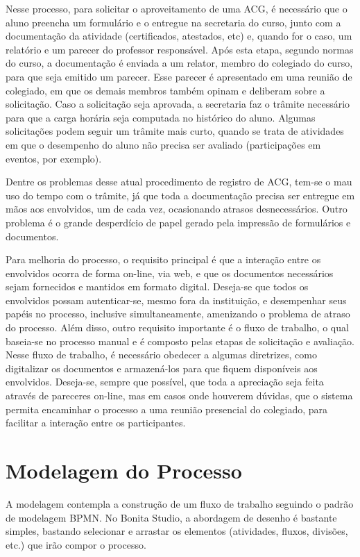 \documentclass[12pt]{article}
\begin{document}
Nesse processo, para solicitar o aproveitamento de uma ACG, é necessário que o aluno preencha um formulário e o entregue na secretaria do curso, junto com a documentação da atividade (certificados, atestados, etc) e, quando for o caso, um relatório e um parecer do professor responsável. Após  esta  etapa,  segundo normas do curso, a documentação é enviada a um relator, membro do colegiado do curso, para que seja emitido um parecer. Esse parecer é apresentado em uma reunião de colegiado, em que os demais membros também opinam e deliberam sobre a solicitação. Caso a solicitação seja  aprovada, a secretaria faz o trâmite necessário para que a carga horária seja computada no histórico do aluno. Algumas solicitações podem seguir um trâmite mais curto, quando se trata de atividades em que o desempenho do aluno não precisa ser avaliado (participações em eventos, por exemplo).

Dentre os problemas desse atual procedimento de registro de ACG, tem-se o mau uso do tempo com o trâmite, já que toda a documentação precisa ser entregue em mãos aos envolvidos, um de cada vez, ocasionando atrasos desnecessários. Outro problema é o grande desperdício de papel gerado pela impressão de formulários e documentos.

Para melhoria do processo, o requisito principal é que a interação entre os envolvidos ocorra de forma on-line, via web, e que os documentos necessários sejam fornecidos e mantidos em formato digital. Deseja-se que todos os envolvidos possam autenticar-se, mesmo fora da instituição, e desempenhar seus papéis no processo, inclusive simultaneamente, amenizando o problema de atraso do processo. Além disso, outro requisito importante é o fluxo de trabalho, o qual baseia-se no processo manual e é composto pelas etapas de solicitação e avaliação. Nesse fluxo de trabalho, é necessário obedecer a algumas diretrizes, como digitalizar os documentos e armazená-los para que fiquem disponíveis aos envolvidos. Deseja-se, sempre que possível, que toda a apreciação seja feita através de pareceres on-line, mas em casos onde houverem dúvidas, que o sistema permita encaminhar o processo a uma reunião presencial do colegiado, para facilitar a interação entre os participantes.

\section{Modelagem do Processo}

A modelagem contempla a construção de um fluxo de trabalho seguindo o padrão de modelagem BPMN. No Bonita Studio, a abordagem de desenho é bastante simples, bastando selecionar e arrastar os elementos (atividades, fluxos, divisões, etc.) que irão compor o processo.
\end{document}

